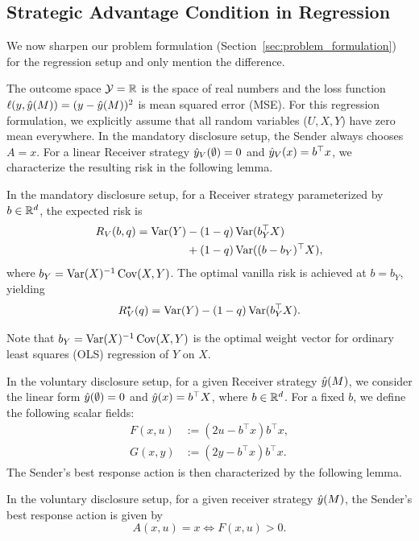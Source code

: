 \subsection{Strategic Advantage Condition in Regression}
\label{sec:regression}

We now sharpen our problem formulation (Section~\ref{sec:problem_formulation}) for the regression setup and only mention the difference.

The outcome space $\mathcal{Y} = \mathbb{R}$ is the space of real numbers and the loss function $\ell(y, \hat{y}(M)) = (y - \hat{y}(M))^2$ is mean squared error (MSE). For this regression formulation, we explicitly assume that all random variables ($U, X, Y$) have zero mean everywhere. In the mandatory disclosure setup, the Sender always chooses $A=x$. For a linear Receiver strategy $\hat{y}_V(\emptyset) = 0$ and $\hat{y}_V(x) = b^\top x$, we characterize the resulting risk in the following lemma.

\begin{lemma} \label{lem:rv_regression} In the mandatory disclosure setup, for a Receiver strategy parameterized by $b \in \mathbb{R}^d$, the expected risk is
\begin{align}
R_V(b, q) = \operatorname{Var}(Y) & - (1-q) \operatorname{Var}(b_Y^\top X) \nonumber \\
& + (1-q)\operatorname{Var}((b-b_Y)^\top X), \label{eq:rv_b}
\end{align}
where $b_Y = \operatorname{Var}(X)^{-1}\operatorname{Cov}(X,Y)$. The optimal vanilla risk is achieved at $b = b_Y$, yielding
\begin{equation}
R_V^\star(q) = \operatorname{Var}(Y) - (1-q) \operatorname{Var}(b_Y^\top X).
\end{equation}
\end{lemma}

\begin{remark}
Note that $b_Y = \operatorname{Var}(X)^{-1}\operatorname{Cov}(X,Y)$ is the optimal weight vector for ordinary least squares (OLS) regression of $Y$ on $X$.
\end{remark}

In the voluntary disclosure setup, for a given Receiver strategy $\hat{y}(M)$, we consider the linear form $\hat{y}(\emptyset) = 0$ and $\hat{y}(x) = b^\top X$, where $b \in \mathbb{R}^d$. For a fixed $b$, we define the following scalar fields:
\begin{align}
F(x,u) &:= (2u - b^\top x) b^\top x, \\
G(x,y) &:= (2y - b^\top x) b^\top x.
\end{align}
The Sender's best response action is then characterized by the following lemma.

\begin{lemma} \label{lem:sender_response}
  In the voluntary disclosure setup, for a given receiver strategy $\hat{y}(M)$, the Sender's best response action is given by
  \begin{equation}
    A(x,u) = x \iff F(x,u) > 0.
  \end{equation}
\end{lemma}

